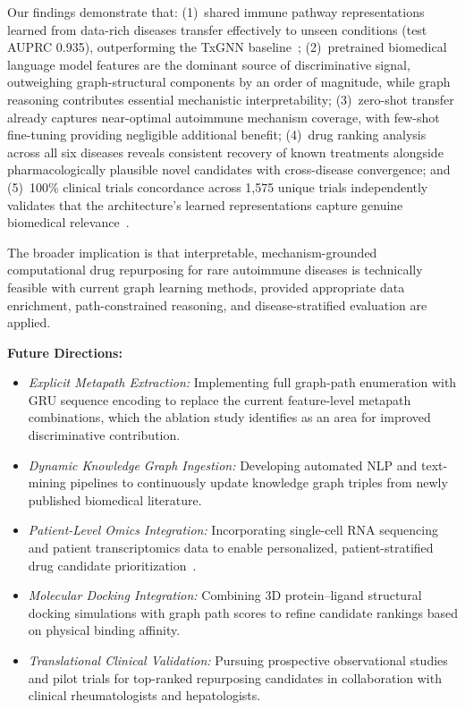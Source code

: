 \documentclass[conference]{IEEEtran}
\begin{document}
Our findings demonstrate that: (1)~shared immune pathway representations learned from data-rich diseases transfer effectively to unseen conditions (test AUPRC 0.935), outperforming the TxGNN baseline~\cite{txgnn}; (2)~pretrained biomedical language model features are the dominant source of discriminative signal, outweighing graph-structural components by an order of magnitude, while graph reasoning contributes essential mechanistic interpretability; (3)~zero-shot transfer already captures near-optimal autoimmune mechanism coverage, with few-shot fine-tuning providing negligible additional benefit; (4)~drug ranking analysis across all six diseases reveals consistent recovery of known treatments alongside pharmacologically plausible novel candidates with cross-disease convergence; and (5)~100\% clinical trials concordance across 1,575 unique trials independently validates that the architecture's learned representations capture genuine biomedical relevance~\cite{clinicaltrials}.

The broader implication is that interpretable, mechanism-grounded computational drug repurposing for rare autoimmune diseases is technically feasible with current graph learning methods, provided appropriate data enrichment, path-constrained reasoning, and disease-stratified evaluation are applied.

\textbf{Future Directions:}
\begin{itemize}
    \item \textit{Explicit Metapath Extraction:} Implementing full graph-path enumeration with GRU sequence encoding to replace the current feature-level metapath combinations, which the ablation study identifies as an area for improved discriminative contribution.
    \item \textit{Dynamic Knowledge Graph Ingestion:} Developing automated NLP and text-mining pipelines to continuously update knowledge graph triples from newly published biomedical literature.
    \item \textit{Patient-Level Omics Integration:} Incorporating single-cell RNA sequencing and patient transcriptomics data to enable personalized, patient-stratified drug candidate prioritization~\cite{omics_repurposing}.
    \item \textit{Molecular Docking Integration:} Combining 3D protein--ligand structural docking simulations with graph path scores to refine candidate rankings based on physical binding affinity.
    \item \textit{Translational Clinical Validation:} Pursuing prospective observational studies and pilot trials for top-ranked repurposing candidates in collaboration with clinical rheumatologists and hepatologists.
\end{itemize}
\end{document}
